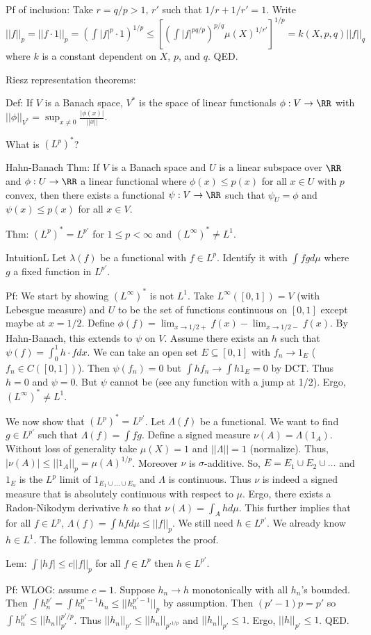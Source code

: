 \documentclass{../uva7310}
\begin{document}
Pf of inclusion: Take $r=q/p>1$, $r'$ such that $1/r+1/r'=1$.
Write $||f||_p=||f\cdot 1||_p=\left(\int |f|^p\cdot 1\right)^{1/p}\leq \left[  \left(\int|f|^{pq/p}\right)^{p/q}\mu(X)^{1/r'} \right]^{1/p}=k(X,p,q)||f||_q$
where $k$ is a constant dependent on $X$, $p$, and $q$. QED.

Riesz representation theorems:

Def: If $V$ is a Banach space, $V^*$ is the space of linear functionals $\phi:V\rightarrow\RR$ with $||\phi||_{V^*}=\sup_{x\neq 0}\frac{|\phi(x)|}{||x||}$.

What is $(L^p)^*$?

Hahn-Banach Thm: If $V$ is a Banach space and $U$ is a linear subspace over $\RR$ and $\phi:U\rightarrow\RR$ a linear functional
where $\phi(x)\leq p(x)$ for all $x\in U$ with $p$ convex, then there exists a functional $\psi:V\rightarrow\RR$ such that
$\psi_U=\phi$ and $\psi(x)\leq p(x)$ for all $x\in V$. 

Thm: $(L^p)^*=L^{p'}$ for $1\leq p<\infty$ and $(L^\infty)^*\neq L^1$.

IntuitionL Let $\lambda(f)$ be a functional with $f\in L^p$. Identify it with $\int fgd\mu$ where $g$ a fixed function in $L^{p'}$.

Pf: 
We start by showing $(L^\infty)^*$ is not $L^1$. Take $L^\infty([0,1])=V$ (with Lebesgue measure) and $U$ to be the set of functions continuous on $[0,1]$
except maybe at $x=1/2$. Define $\phi(f)=\lim_{x\to 1/2 +} f(x)-\lim_{x\to 1/2 -}f(x)$. By Hahn-Banach, this extends to $\psi$ on $V$.
Assume there exists an $h$ such that $\psi(f)=\int_0^1 h\cdot f d x$. We can take an open set $E\subseteq [0,1]$ with $f_n\to 1_E$ ($f_n\in C([0,1])$).
Then $\psi(f_n)=0$ but $\int h f_n\to \int h 1_E=0$ by DCT. Thus $h=0$ and $\psi=0$. But $\psi$ cannot be (see any function with a jump at 1/2).
Ergo, $(L^\infty)^*\neq L^1$.

We now show that $(L^p)^*=L^{p'}$. Let $\Lambda(f)$ be a functional. We want to find $g\in L^{p'}$ such that $\Lambda(f)=\int fg$.
Define a signed measure $\nu(A)=\Lambda (1_A)$. Without loss of generality take $\mu(X)=1$ and $||\Lambda||=1$ (normalize).
Thus, $|\nu(A)|\leq ||1_A||_p=\mu(A)^{1/p}$. Moreover $\nu$ is $\sigma$-additive. So, $E=E_1\cup E_2\cup\ldots$ and
$1_E$ is the $L^p$ limit of $1_{E_1\cup \dots\cup E_n}$ and $\Lambda$ is continuous. Thus $\nu$ is indeed a signed measure
that is absolutely continuous with respect to $\mu$. Ergo, there exists a Radon-Nikodym derivative $h$ so that
$\nu(A)=\int_A h d\mu$. This further implies that for all $f\in L^p$, $\Lambda(f)=\int hf d\mu\leq ||f||_p$. We still need $h\in L^{p'}$.
We already know $h\in L^1$. The following lemma completes the proof.

Lem: $\int |hf|\leq c||f||_p$ for all $f\in L^p$ then $h\in L^{p'}$.

Pf: WLOG: assume $c=1$. Suppose $h_n\to h$ monotonically with all $h_n$'s bounded. Then $\int h_n^{p'}=\int h_n^{p'-1}h_n\leq ||h_n^{p'-1}||_p$ by
assumption. Then $(p'-1)p=p'$ so $\int h_n^{p'}\leq ||h_n||_{p'}^{p'/p}$. Thus $||h_n||_{p'}\leq ||h_n||_{p'^{1/p}}$ and
$||h_n||_{p'}\leq 1$. Ergo, $||h||_{p'}\leq 1$. QED.
\end{document}
